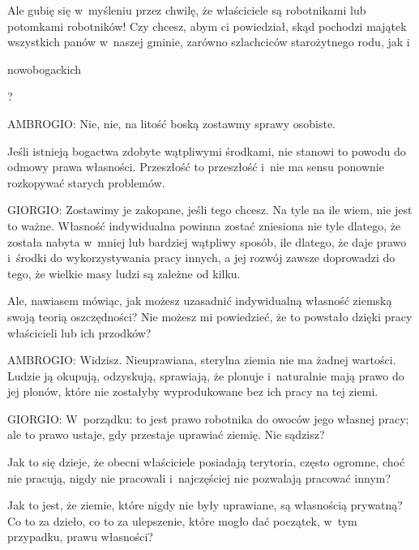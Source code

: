 \documentclass[oneside,polish,11pt,sfheadings]{mwbk}
\begin{document}
 
Ale gubię się w~myśleniu przez chwilę, że właściciele są robotnikami lub potomkami robotników! Czy chcesz, abym ci
powiedział, skąd pochodzi majątek wszystkich panów w~naszej gminie, zarówno szlachciców starożytnego rodu, jak
i\begin{itshape}nowobogackich \end{itshape}? 




 
\noindent AMBROGIO: Nie, nie, na litość boską zostawmy sprawy osobiste. 

 
Jeśli istnieją bogactwa zdobyte wątpliwymi środkami, nie stanowi to powodu do odmowy prawa własności. Przeszłość to
przeszłość i~nie ma sensu ponownie rozkopywać starych problemów. 




 
\noindent GIORGIO: Zostawimy je zakopane, jeśli tego chcesz. Na tyle na ile wiem, nie jest to ważne. Własność indywidualna powinna
zostać zniesiona nie tyle dlatego, że została nabyta w~mniej lub bardziej wątpliwy sposób, ile dlatego, że daje prawo i~środki do wykorzystywania pracy innych, a jej rozwój zawsze doprowadzi do tego, że wielkie masy ludzi są zależne od
kilku. 

 
Ale, nawiasem mówiąc, jak możesz uzasadnić indywidualną własność ziemską swoją teorią oszczędności? Nie możesz mi
powiedzieć, że to powstało dzięki pracy właścicieli lub ich przodków? 




 
\noindent AMBROGIO: Widzisz. Nieuprawiana, sterylna ziemia nie ma żadnej wartości. Ludzie ją okupują, odzyskują, sprawiają, że
plonuje i~naturalnie mają prawo do jej plonów, które nie zostałyby wyprodukowane bez ich pracy na tej ziemi. 




 
\noindent GIORGIO: W~porządku: to jest prawo robotnika do owoców jego własnej pracy; ale to prawo ustaje, gdy przestaje uprawiać
ziemię. Nie sądzisz? 

 
Jak to się dzieje, że obecni właściciele posiadają terytoria, często ogromne, choć nie pracują, nigdy nie pracowali i~najczęściej nie pozwalają pracować innym? 

 
Jak to jest, że ziemie, które nigdy nie były uprawiane, są własnością prywatną? Co to za dzieło, co to za ulepszenie,
które mogło dać początek, w~tym przypadku, prawu własności? 
\end{document}
